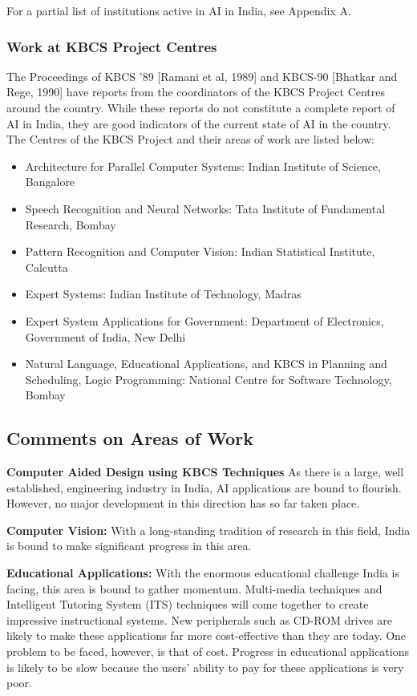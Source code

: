 For a partial list of institutions active in AI in India, 
see Appendix A.

\subsubsection*{Work at KBCS Project Centres}
The Proceedings of KBCS '89 [Ramani et al, 1989] and KBCS-90 [Bhatkar and Rege, 1990] have reports from the
coordinators of the KBCS Project Centres around the country.  While these
reports do not constitute a complete report of AI in India,
they are good indicators of the current state of AI in the country.
The Centres of the KBCS Project and their areas of work are
listed below:
\begin{itemize}
\item Architecture for Parallel Computer Systems: Indian Institute of
Science, Bangalore 
 \item Speech Recognition and Neural Networks:
Tata Institute of Fundamental Research, Bombay
 \item Pattern Recognition and Computer Vision: 
Indian Statistical Institute, Calcutta
 \item Expert Systems: Indian Institute of Technology, Madras
 \item Expert System Applications for Government:
Department of Electronics, Government of India, New Delhi
 \item Natural Language, Educational Applications, and KBCS in
Planning and Scheduling, Logic Programming: National Centre for
Software Technology, Bombay 
 \end{itemize}

\subsection{Comments on Areas of Work}
{\bf Computer Aided Design using KBCS Techniques}
As there is a large, well established, engineering industry in India, AI
applications are bound to flourish.  However, no major
development in this direction has so far taken place. 

{\bf Computer Vision:}
With a long-standing tradition of research in this field, India is
bound to make significant progress in this area.

{\bf Educational Applications:}
With the enormous educational challenge India is facing, 
this area is bound to gather momentum.  Multi-media
techniques and Intelligent Tutoring System (ITS) techniques will come together
to create impressive instructional systems.  New
peripherals such as CD-ROM drives are likely to make
these applications far more cost-effective than
they are today.
One problem to be faced, however, is that of cost.  Progress in educational
applications is likely to be slow because the users' ability
to pay for these applications is very poor.

